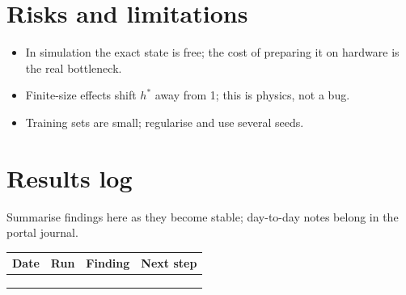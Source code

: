 \documentclass[11pt,a4paper]{article}
\begin{document}
\section{Risks and limitations}
\begin{itemize}
  \item In simulation the exact state is free; the cost of preparing it on hardware is the real bottleneck.
  \item Finite-size effects shift $h^*$ away from 1; this is physics, not a bug.
  \item Training sets are small; regularise and use several seeds.
\end{itemize}

\section{Results log}
\label{sec:log}
Summarise findings here as they become stable; day-to-day notes belong in the portal journal.

\begin{table}[h]
\centering\small
\begin{tabularx}{\linewidth}{@{}l l >{\raggedright}X >{\raggedright\arraybackslash}X@{}}
\toprule
Date & Run & Finding & Next step \\
\midrule
 & & & \\
 & & & \\
 & & & \\
\bottomrule
\end{tabularx}
\end{table}



\end{document}
